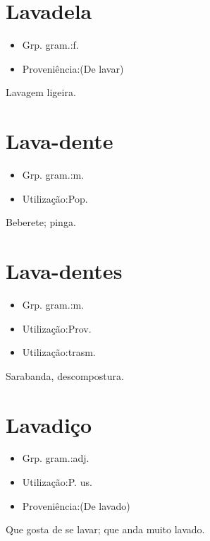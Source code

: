 \section{Lavadela}
\begin{itemize}
\item {Grp. gram.:f.}
\end{itemize}
\begin{itemize}
\item {Proveniência:(De \textunderscore lavar\textunderscore )}
\end{itemize}
Lavagem ligeira.
\section{Lava-dente}
\begin{itemize}
\item {Grp. gram.:m.}
\end{itemize}
\begin{itemize}
\item {Utilização:Pop.}
\end{itemize}
Beberete; pinga.
\section{Lava-dentes}
\begin{itemize}
\item {Grp. gram.:m.}
\end{itemize}
\begin{itemize}
\item {Utilização:Prov.}
\end{itemize}
\begin{itemize}
\item {Utilização:trasm.}
\end{itemize}
Sarabanda, descompostura.
\section{Lavadiço}
\begin{itemize}
\item {Grp. gram.:adj.}
\end{itemize}
\begin{itemize}
\item {Utilização:P. us.}
\end{itemize}
\begin{itemize}
\item {Proveniência:(De \textunderscore lavado\textunderscore )}
\end{itemize}
Que gosta de se lavar; que anda muito lavado.
